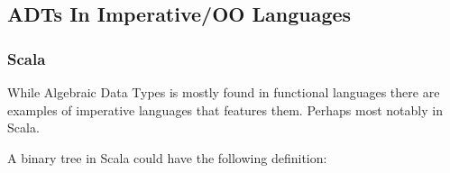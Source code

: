 \documentclass[10pt]{report}
\newcommand{\KIKO}[1]{\textcolor{red}{\textbf{[Kiko: #1]}}}
\begin{document}


\subsection{ADTs In Imperative/OO Languages}
\subsubsection{Scala}


\par{While Algebraic Data Types is mostly found in functional languages there are examples of imperative languages that features them. Perhaps most notably in Scala.}
\par{A binary tree in Scala could have the following definition:}
\end{document}
